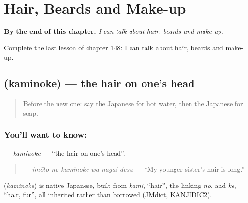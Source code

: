 
\chapter{Hair, Beards and Make-up}
\label{ch:ja-hair-beards-and-make-up}

\begin{chapteropening}
\textbf{By the end of this chapter:} \emph{I can talk about hair, beards and make-up.}

Complete the last lesson of chapter 148: I can talk about hair, beards and make-up.
\end{chapteropening}

\section[\texorpdfstring{\ja{かみのけ} (kaminoke)}{かみのけ (kaminoke)}]{ (kaminoke) — the hair on one's head}

\label{lesson:JA-C148-kaminoke}



\begin{quote}
Before the new one: say the Japanese for hot water, then the Japanese for soap.
\end{quote}

\subsection*{You'll want to know: }
\textbf{} — \emph{kaminoke} — \textquotedblleft{}the hair on one's head\textquotedblright{}.

\begin{quote}
\textbf{  } — \emph{imōto no kaminoke wa nagai desu} — \textquotedblleft{}My younger sister's hair is long.\textquotedblright{}
\end{quote}

\begin{cousinweb}
\textbf{} (\emph{kaminoke}) is native Japanese, built from \emph{kami}, \textquotedblleft{}hair\textquotedblright{}, the linking \emph{no}, and \emph{ke}, \textquotedblleft{}hair, fur\textquotedblright{}, all inherited rather than borrowed (JMdict, KANJIDIC2).
\end{cousinweb}

